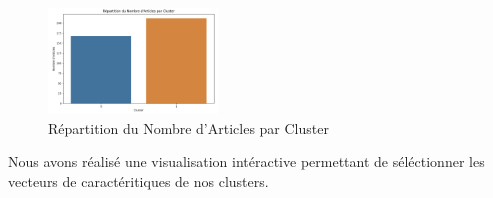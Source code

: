 \documentclass{article}
\begin{document}
\begin{figure}[!htbp]
    \centering
    \includegraphics[width=0.4\textwidth]{repart.png}
    \caption{Répartition du Nombre d'Articles par Cluster}
    \label{fig: Répartition du Nombre d'Articles par Cluster}
\end{figure}

Nous avons réalisé une visualisation intéractive permettant de séléctionner les vecteurs de caractéritiques de nos clusters. 
\end{document}
